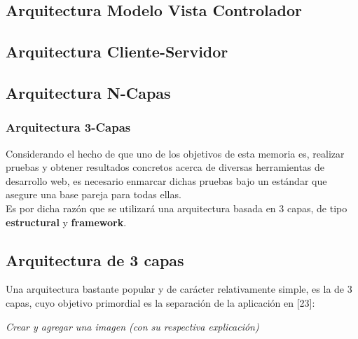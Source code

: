 




\subsection{Arquitectura Modelo Vista Controlador}

\subsection{Arquitectura Cliente-Servidor}

\subsection{Arquitectura N-Capas}

\subsubsection{Arquitectura 3-Capas}

Considerando el hecho de que uno de los objetivos de esta memoria es, realizar pruebas y obtener
resultados concretos acerca de diversas herramientas de desarrollo web, es necesario enmarcar
dichas pruebas bajo un estándar que asegure una base pareja para todas ellas.\\

Es por dicha razón que se utilizará una arquitectura basada en 3 capas, de tipo \textbf{estructural} y 
\textbf{framework}.\\

\subsection{Arquitectura de 3 capas}
Una arquitectura bastante popular y de carácter relativamente simple, es la de 3 capas, cuyo
objetivo primordial es la separación de la aplicación en [23]:

\textit{Crear y agregar una imagen (con su respectiva explicación)}\\

